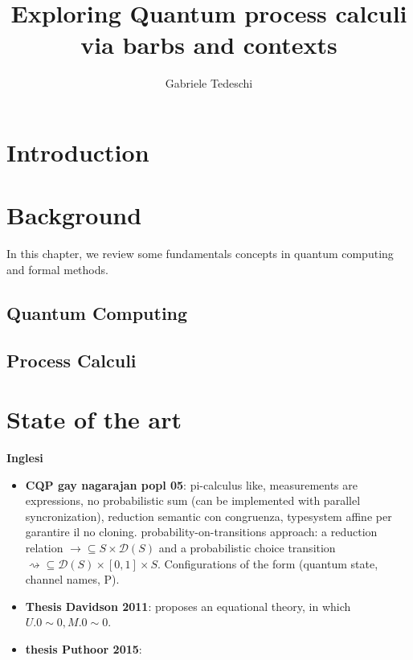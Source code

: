 \documentclass[10pt,a4paper, titlepage]{report}
\title{Exploring Quantum process calculi via barbs and contexts }
\author{Gabriele Tedeschi}
\newcommand{\note}[1]{{\color{red} #1}}
\newcommand{\distr}{\mathcal{D}}
\begin{document}
\maketitle

\tableofcontents

\chapter{Introduction}

\chapter{Background}
In this chapter, we review some fundamentals concepts in quantum computing and formal methods.

\section{Quantum Computing}


\section{Process Calculi}	





\chapter{State of the art}

\note{\textbf{Inglesi}}
\begin{itemize}
\item \textbf{CQP gay nagarajan popl 05}: pi-calculus like, measurements are expressions, no probabilistic sum (can be implemented with parallel syncronization), reduction semantic con congruenza, typesystem affine per garantire il no cloning. probability-on-transitions approach: a reduction relation $\rightarrow \subseteq S \times \distr(S)$ and a probabilistic choice transition $\rightsquigarrow \subseteq \distr(S)\times [0, 1] \times S$. Configurations of the form (quantum state, channel names, P).

\item \textbf{Thesis Davidson 2011}: proposes an equational theory, in which $U.0 \sim 0, M.0 \sim 0$.

\item \textbf{thesis Puthoor 2015}:
\end{itemize}
\end{document}
